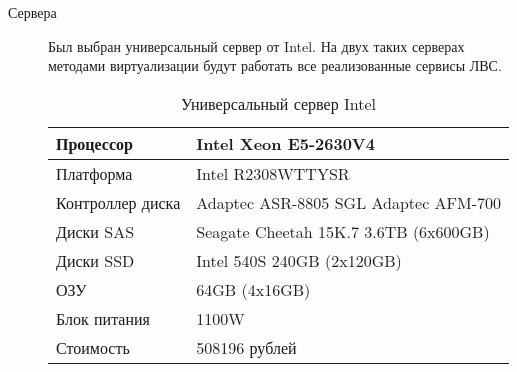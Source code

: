 \begin{description}
\item[Сервера]
  Был выбран универсальный сервер от Intel. На двух таких серверах методами виртуализации будут работать все реализованные сервисы ЛВС.
  \begin{table}[!htp]
    \centering
    \begin{tabular}{|l|l|}%
      \hline
      Процессор & Intel Xeon E5-2630V4 \\ \hline
      Платформа & Intel R2308WTTYSR \\ \hline
      Контроллер диска & Adaptec ASR-8805 SGL \newline Adaptec AFM-700  \\ \hline
      Диски SAS & Seagate Cheetah 15K.7 3.6TB (6x600GB) \\ \hline
      Диски SSD & Intel 540S 240GB (2x120GB) \\ \hline
      ОЗУ & 64GB (4x16GB) \\ \hline
      Блок питания & 1100W \\ \hline
      Стоимость & 508196 рублей \\ \hline
    \end{tabular}
    \caption{Универсальный сервер Intel}
    \label{table:server}
  \end{table}
\end{description}